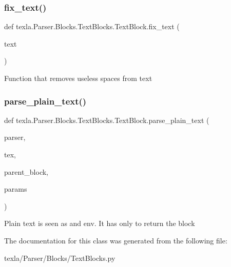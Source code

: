 \subsubsection{\texorpdfstring{fix\+\_\+text()}{fix\_text()}}
{\footnotesize\ttfamily def texla.\+Parser.\+Blocks.\+Text\+Blocks.\+Text\+Block.\+fix\+\_\+text (\begin{DoxyParamCaption}\item[{}]{text }\end{DoxyParamCaption})\hspace{0.3cm}{\ttfamily [static]}}

\begin{DoxyVerb}Function that removes useless spaces from text\end{DoxyVerb}
 \hypertarget{classtexla_1_1Parser_1_1Blocks_1_1TextBlocks_1_1TextBlock_a3a56fbfda7373ac5a103d5af52780b1a}{}\label{classtexla_1_1Parser_1_1Blocks_1_1TextBlocks_1_1TextBlock_a3a56fbfda7373ac5a103d5af52780b1a} 
\subsubsection{\texorpdfstring{parse\+\_\+plain\+\_\+text()}{parse\_plain\_text()}}
{\footnotesize\ttfamily def texla.\+Parser.\+Blocks.\+Text\+Blocks.\+Text\+Block.\+parse\+\_\+plain\+\_\+text (\begin{DoxyParamCaption}\item[{}]{parser,  }\item[{}]{tex,  }\item[{}]{parent\+\_\+block,  }\item[{}]{params }\end{DoxyParamCaption})\hspace{0.3cm}{\ttfamily [static]}}

\begin{DoxyVerb}Plain text is seen as and env. It has only to return
the block\end{DoxyVerb}
 

The documentation for this class was generated from the following file\+:\begin{DoxyCompactItemize}
\item 
texla/\+Parser/\+Blocks/Text\+Blocks.\+py\end{DoxyCompactItemize}
